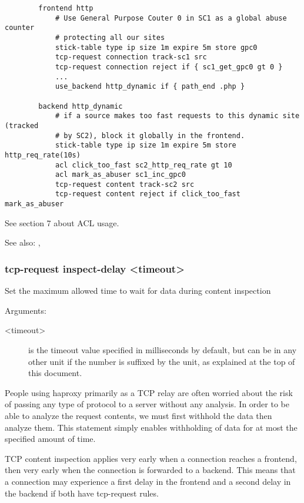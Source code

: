   \begin{verbatim}
        frontend http
            # Use General Purpose Couter 0 in SC1 as a global abuse counter
            # protecting all our sites
            stick-table type ip size 1m expire 5m store gpc0
            tcp-request connection track-sc1 src
            tcp-request connection reject if { sc1_get_gpc0 gt 0 }
            ...
            use_backend http_dynamic if { path_end .php }

        backend http_dynamic
            # if a source makes too fast requests to this dynamic site (tracked
            # by SC2), block it globally in the frontend.
            stick-table type ip size 1m expire 5m store http_req_rate(10s)
            acl click_too_fast sc2_http_req_rate gt 10
            acl mark_as_abuser sc1_inc_gpc0
            tcp-request content track-sc2 src
            tcp-request content reject if click_too_fast mark_as_abuser
  \end{verbatim}

  See section 7 about ACL usage.

  See also: , 

\subsubsection[tcp-request inspect-delay]{tcp-request inspect-delay <timeout>}


  Set the maximum allowed time to wait for data during content inspection


  Arguments:
  \begin{description}
  \item[<timeout>] is the timeout value specified in milliseconds by default, but
              can be in any other unit if the number is suffixed by the unit,
              as explained at the top of this document.
  \end{description}

  People using haproxy primarily as a TCP relay are often worried about the
  risk of passing any type of protocol to a server without any analysis. In
  order to be able to analyze the request contents, we must first withhold
  the data then analyze them. This statement simply enables withholding of
  data for at most the specified amount of time.

  TCP content inspection applies very early when a connection reaches a
  frontend, then very early when the connection is forwarded to a backend. This
  means that a connection may experience a first delay in the frontend and a
  second delay in the backend if both have tcp-request rules.

